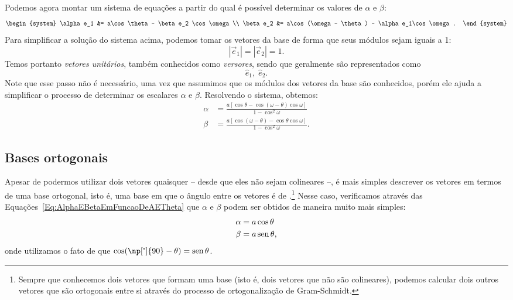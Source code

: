 Podemos agora montar um sistema de equações a partir do qual é possível determinar os valores de $\alpha$ e $\beta$:
\begin{equation}
\begin{system}
    \alpha e_1 &= a\cos\theta - \beta e_2 \cos\omega \\
    \beta e_2 &= a\cos(\omega - \theta) - \alpha e_1\cos\omega.
\end{system}
\end{equation}
%
Para simplificar a solução do sistema acima, podemos tomar os vetores da base de forma que seus módulos sejam iguais a 1:
\begin{equation}
    |\vec{e}_1| = |\vec{e}_2| = 1.
\end{equation}
%
Temos portanto \emph{vetores unitários}, também conhecidos como \emph{versores}, sendo que geralmente são representados como
\begin{displaymath}
    \hat{e}_1, \;\hat{e}_2.
\end{displaymath}
%
Note que esse passo não é necessário, uma vez que assumimos que os módulos dos vetores da base são conhecidos, porém ele ajuda a simplificar o processo de determinar os escalares $\alpha$ e $\beta$. Resolvendo o sistema, obtemos:
\begin{align}\label{Eq:AlphaEBetaEmFuncaoDeAETheta}
    \alpha &= \frac{a[\cos\theta - \cos(\omega-\theta)\cos\omega]}{1-\cos^2\omega} \\
    \beta &= \frac{a[\cos(\omega - \theta) - \cos\theta\cos\omega]}{1-\cos^2\omega}.
\end{align}

\subsection{Bases ortogonais}\label{Sec:ComponentesVetoriais}

Apesar de podermos utilizar dois vetores quaisquer -- desde que eles não sejam colineares --, é mais simples descrever os vetores em termos de uma base ortogonal, isto é, uma base em que o ângulo entre os vetores é de .\footnote[][-2cm]{Sempre que conhecemos dois vetores que formam uma base (isto é, dois vetores que não são colineares), podemos calcular dois outros vetores que são ortogonais entre si através do processo de ortogonalização de Gram-Schmidt.} Nesse caso, verificamos através das Equações~\eqref{Eq:AlphaEBetaEmFuncaoDeAETheta} que $\alpha$ e $\beta$ podem ser obtidos de maneira muito mais simples:
\begin{align}
    \alpha &= a\cos\theta \\
    \beta &= a\operatorname{sen}\theta,
\end{align}
%
onde utilizamos o fato de que $\cos(\np[\tcdegree]{90} - \theta) = \sen\theta$.

